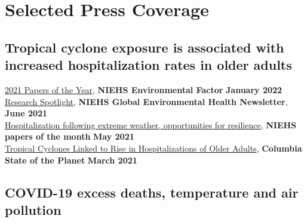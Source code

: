 \section*{Selected Press Coverage}

\subsection*{Tropical cyclone exposure is associated with increased hospitalization rates in older adults}

\href{https://factor.niehs.nih.gov/2022/1/papers/papers-of-the-year/index.htm}{2021 Papers of the Year}, \textbf{NIEHS Environmental Factor} \hfill \textbf{January 2022}\\
\href{https://www.niehs.nih.gov/research/programs/geh/geh_newsletter/2021/6/spotlight/hurricanes_and_tropical_cyclones_associated_with_increased_hospitalization_rates_in_older_adults.cfm}{Research Spotlight}, \textbf{NIEHS Global Environmental Health Newsletter}, \hfill \textbf{June 2021}\\
\href{https://factor.niehs.nih.gov/2021/5/papers/dert/index.htm?utm_source=efactor-newsletter&utm_medium=email&utm_campaign=efactor-newsletter-2021-May#a3}{Hospitalization following extreme weather, opportunities for resilience}, \textbf{NIEHS papers of the month} \hfill \textbf{May 2021}\\
\href{https://news.climate.columbia.edu/2021/03/09/tropical-cyclones-linked-rise-hospitalizations-older-adults/}{Tropical Cyclones Linked to Rise in Hospitalizations of Older Adults}, \textbf{Columbia State of the Planet} \hfill \textbf{March 2021}

\subsection*{COVID-19 excess deaths, temperature and air pollution}

